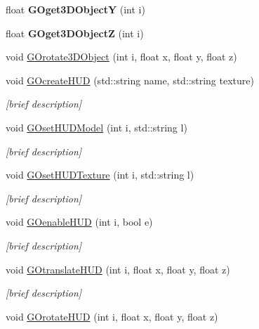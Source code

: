 \begin{DoxyCompactItemize}
\item 
\hypertarget{class_i_s_e_a2dfbb2c1ef6381545ccea80464ed2783}{float {\bfseries G\-Oget3\-D\-Object\-Y} (int i)}\label{class_i_s_e_a2dfbb2c1ef6381545ccea80464ed2783}

\item 
\hypertarget{class_i_s_e_a7b64147a06fb735e921a5677391a1856}{float {\bfseries G\-Oget3\-D\-Object\-Z} (int i)}\label{class_i_s_e_a7b64147a06fb735e921a5677391a1856}

\item 
void \hyperlink{class_i_s_e_a0d81cfe1ecae75769d1b4c9be2b8782c}{G\-Orotate3\-D\-Object} (int i, float x, float y, float z)
\item 
void \hyperlink{class_i_s_e_a30ee9e809cae19ce4b27f374b661194a}{G\-Ocreate\-H\-U\-D} (std\-::string name, std\-::string texture)
\begin{DoxyCompactList}\small\item\em \mbox{[}brief description\mbox{]} \end{DoxyCompactList}\item 
void \hyperlink{class_i_s_e_a9cfdbcb7d771a266be56de7162c8826b}{G\-Oset\-H\-U\-D\-Model} (int i, std\-::string l)
\begin{DoxyCompactList}\small\item\em \mbox{[}brief description\mbox{]} \end{DoxyCompactList}\item 
void \hyperlink{class_i_s_e_a6cc254ab083124145235f693b14405a5}{G\-Oset\-H\-U\-D\-Texture} (int i, std\-::string l)
\begin{DoxyCompactList}\small\item\em \mbox{[}brief description\mbox{]} \end{DoxyCompactList}\item 
void \hyperlink{class_i_s_e_ae0d9089b4df165f944179c37f3e35b38}{G\-Oenable\-H\-U\-D} (int i, bool e)
\begin{DoxyCompactList}\small\item\em \mbox{[}brief description\mbox{]} \end{DoxyCompactList}\item 
void \hyperlink{class_i_s_e_ab342208e1436b0e9f456434c65d7b96c}{G\-Otranslate\-H\-U\-D} (int i, float x, float y, float z)
\begin{DoxyCompactList}\small\item\em \mbox{[}brief description\mbox{]} \end{DoxyCompactList}\item 
void \hyperlink{class_i_s_e_ae0dc006a24643cc17ca2ab407836822c}{G\-Orotate\-H\-U\-D} (int i, float x, float y, float z)

\end{DoxyCompactItemize}
